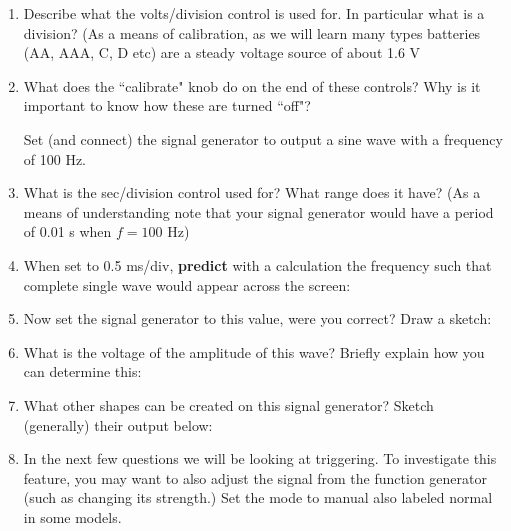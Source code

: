 \documentclass[onecolumn]{article}
\begin{document}
\begin{enumerate}

\item Describe what the volts/division control is used for. In particular what is a division? (As a means of calibration, as we will learn many types batteries (AA, AAA, C, D etc) are a steady voltage source of about 1.6 V


\item  What does the ``calibrate" knob do on the end of these controls? Why is it important to know how these are turned ``off"? 


\pagebreak 

Set (and connect) the signal generator to output a sine wave with a frequency of 100 Hz.

\item What is the sec/division control used for? What range does it have? (As a means of understanding note that your signal generator would have a period of 0.01 s when $f=100$ Hz)


\item When set to 0.5 ms/div, \textbf{predict} with a calculation the frequency such that complete single wave would appear across the screen:


\item Now set the signal generator to this value, were you correct? Draw a sketch:


\item What is the voltage of the amplitude of this wave? Briefly explain how you can determine this: 


\item What other shapes can be created on this signal generator? Sketch (generally) their output below: 


\pagebreak 

\item In the next few questions we will be looking at triggering. To investigate this feature, you may want to also adjust the signal from the function generator (such as changing its strength.) Set the mode to manual also labeled normal in some models. 


\end{enumerate}
\end{document}
